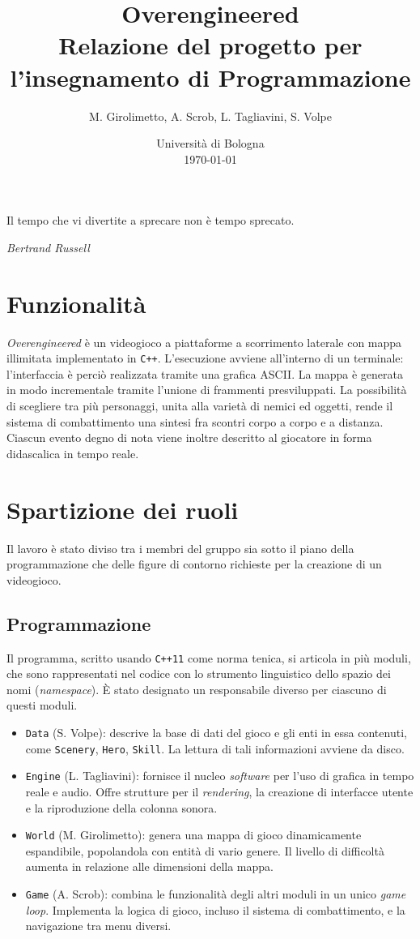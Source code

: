 \documentclass[a4paper]{article}
\title{Overengineered \\
\large Relazione del progetto per l'insegnamento di Programmazione}
\author{
  M. Girolimetto,
  A. Scrob,
  L. Tagliavini,
  S. Volpe
}
\date{
	Universit\`a di Bologna \\
  \today
}
\begin{document}
\maketitle

\epigraph{Il tempo che vi divertite a sprecare non è tempo sprecato.}
{\textit{Bertrand Russell}}

\section{Funzionalit\`a}

\emph{Overengineered} \`e un videogioco a piattaforme a scorrimento laterale con
mappa illimitata implementato in \verb!C++!. L'esecuzione avviene all'interno di
un terminale: l'interfaccia \`e perci\`o realizzata tramite una grafica ASCII.
La mappa \`e generata in modo incrementale tramite l'unione di frammenti
presviluppati. La possibilit\`a di scegliere tra pi\`u personaggi, unita alla
variet\`a di nemici ed oggetti, rende il sistema di combattimento una sintesi
fra scontri corpo a corpo e a distanza. Ciascun evento degno di nota viene
inoltre descritto al giocatore in forma didascalica in tempo reale.

\section{Spartizione dei ruoli}

Il lavoro \`e stato diviso tra i membri del gruppo sia sotto il piano della
programmazione che delle figure di contorno richieste per la creazione di un
videogioco.

\subsection{Programmazione}

Il programma, scritto usando \verb!C++11! come norma tenica, si articola in
pi\`u moduli, che sono rappresentati nel codice con lo strumento linguistico
dello spazio dei nomi (\emph{namespace}). \`E stato designato un responsabile
diverso per ciascuno di questi moduli.
\begin{itemize}
  \item \verb!Data! (S. Volpe): descrive la base di dati del gioco e gli enti in
    essa contenuti, come \verb!Scenery!, \verb!Hero!, \verb!Skill!. La lettura
    di tali informazioni avviene da disco.
  \item \verb!Engine! (L. Tagliavini): fornisce il nucleo \emph{software} per
    l'uso di grafica in tempo reale e audio. Offre strutture per il
    \emph{rendering}, la creazione di interfacce utente e la riproduzione della
    colonna sonora.
  \item \verb!World! (M. Girolimetto): genera una mappa di gioco dinamicamente
    espandibile, popolandola con entit\`a di vario genere. Il livello di
    difficolt\`a aumenta in relazione alle dimensioni della mappa.
  \item \verb!Game! (A. Scrob): combina le funzionalit\`a degli altri moduli in
    un unico \emph{game loop}. Implementa la logica di gioco, incluso il sistema
    di combattimento, e la navigazione tra menu diversi.
\end{itemize}
\end{document}
